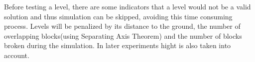 \documentclass[sigconf]{acmart}
\begin{document}
Before testing a level, there are some indicators %
that a level would 
not be a valid solution
and thus simulation can be skipped, avoiding this time consuming process.
Levels will be penalized by its distance to the ground, the number of overlapping
blocks(using Separating Axis Theorem\cite{ericson2004real}) and the number of blocks broken during the simulation. In later experiments
hight is also taken into account.



\end{document}
